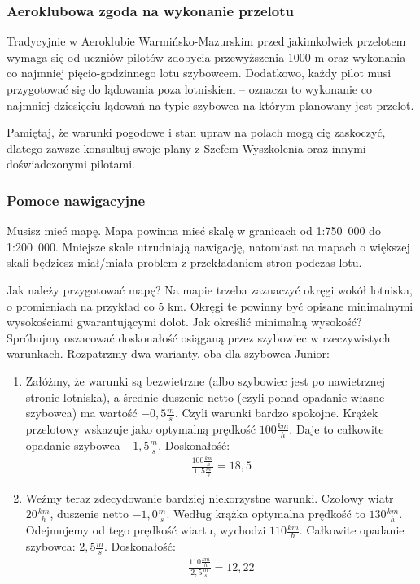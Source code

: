 \documentclass{article}
\begin{document}
\subsubsection{Aeroklubowa zgoda na wykonanie przelotu}
Tradycyjnie w Aeroklubie Warmińsko-Mazurskim przed jakimkolwiek przelotem
wymaga się od uczniów-pilotów zdobycia przewyższenia 1000 m oraz wykonania
co najmniej pięcio-godzinnego lotu szybowcem. Dodatkowo, każdy pilot musi
przygotować się do lądowania poza lotniskiem -- oznacza to wykonanie co
najmniej dziesięciu lądowań na typie szybowca na którym planowany jest
przelot.

Pamiętaj, że warunki pogodowe i stan upraw na polach mogą cię zaskoczyć,
dlatego zawsze konsultuj swoje plany z Szefem Wyszkolenia oraz innymi
doświadczonymi pilotami.

\subsubsection{Pomoce nawigacyjne}
Musisz mieć mapę. Mapa powinna mieć skalę
w granicach od 1:750~000 do 1:200~000. Mniejsze skale utrudniają
nawigację, natomiast na mapach o większej skali będziesz miał/miała
problem z przekładaniem stron podczas lotu.

Jak należy przygotować mapę? Na mapie trzeba zaznaczyć okręgi
wokół lotniska, o promieniach
na przykład co 5 km. Okręgi te powinny być opisane minimalnymi
wysokościami gwarantującymi dolot. Jak określić minimalną wysokość?
Spróbujmy oszacować doskonałość osiąganą przez szybowiec w rzeczywistych
warunkach. Rozpatrzmy dwa warianty, oba dla szybowca Junior:

\begin{enumerate}
\item Załóżmy, że warunki są bezwietrzne (albo szybowiec jest po
    nawietrznej stronie lotniska), a średnie duszenie netto
    (czyli ponad opadanie własne szybowca) ma wartość
    $-0,5 \frac{m}{s}$. Czyli warunki bardzo spokojne. Krążek przelotowy
    wskazuje jako optymalną prędkość $100 \frac{km}{h}$. Daje
    to całkowite opadanie szybowca $-1,5 \frac{m}{s}$. Doskonałość:
    \begin{align*}
        \frac{100 \frac{km}{h}}{1,5 \frac{m}{s}} = 18,5
    \end{align*}

\item Weźmy teraz zdecydowanie bardziej niekorzystne warunki. Czołowy
    wiatr $20 \frac{km}{h}$, duszenie netto $-1,0 \frac{m}{s}$.
    Według krążka optymalna prędkość to $130 \frac{km}{h}$.
    Odejmujemy od tego prędkość wiartu, wychodzi $110 \frac{km}{h}$.
    Całkowite opadanie szybowca: $2,5 \frac{m}{s}$. Doskonałość:
    \begin{align*}
        \frac{110 \frac{km}{h}}{2,5 \frac{m}{s}} = 12,22
    \end{align*}
\end{enumerate}
\end{document}
